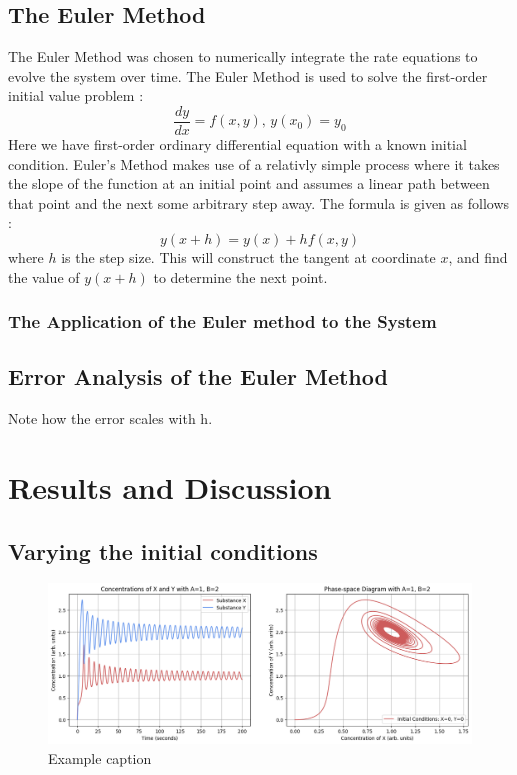 \documentclass[reprint, amsmath, amssymb, aps]{revtex4-2}
\begin{document}
\subsection{The Euler Method}
The Euler Method was chosen to numerically integrate the rate equations to evolve the system over time. The Euler Method is used to solve the first-order initial value problem \cite{eulerError}:
\begin{equation}
	\frac{dy}{dx} = f\left(x, y \right),\, y(x_0) = y_0
\end{equation}Here we have first-order ordinary differential equation with a known initial condition. Euler's Method makes use of a relativly simple process where it takes the slope of the function at an initial point and assumes a linear path between that point and the next some arbitrary step away. The formula is given as follows \cite{paulsNotes}:
\begin{equation}
	y(x+h) = y(x) + h f(x, y)
\end{equation}where $h$ is the step size. This will construct the tangent at coordinate $x$, and find the value of $y(x+h)$ to determine the next point.

\subsubsection{The Application of the Euler method to the System}

\subsection{Error Analysis of the Euler Method}
Note how the error scales with h.

\section{Results and Discussion}

\subsection{Varying the initial conditions}

\begin{figure}
\includegraphics[width=2\columnwidth]{combinedPlot.png}
\caption{\label{fig:combinedPlot}Example caption}
\end{figure}
\end{document}
